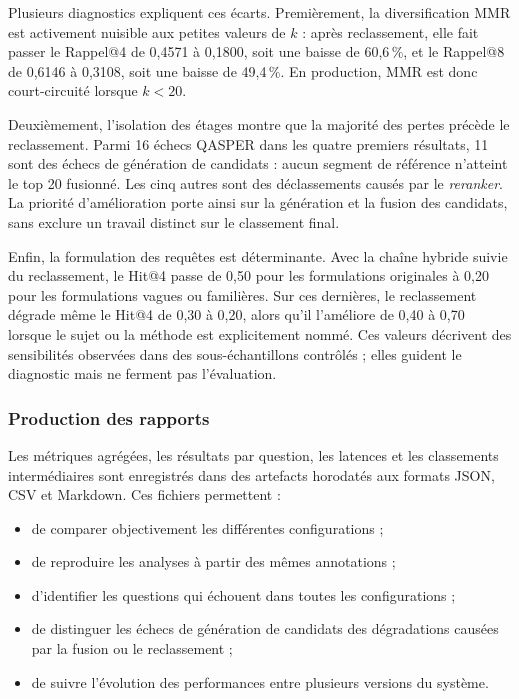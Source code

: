Plusieurs diagnostics expliquent ces écarts. Premièrement, la diversification MMR
est activement nuisible aux petites valeurs de \(k\) : après reclassement, elle fait
passer le Rappel@4 de 0,4571 à 0,1800, soit une baisse de 60,6\,\%, et le Rappel@8
de 0,6146 à 0,3108, soit une baisse de 49,4\,\%. En production, MMR est donc
court-circuité lorsque \(k<20\).

Deuxièmement, l'isolation des étages montre que la majorité des pertes précède le
reclassement. Parmi 16 échecs QASPER dans les quatre premiers résultats, 11 sont
des échecs de génération de candidats : aucun segment de référence n'atteint le
top 20 fusionné. Les cinq autres sont des déclassements causés par le
\emph{reranker}. La priorité d'amélioration porte ainsi sur la génération et la
fusion des candidats, sans exclure un travail distinct sur le classement final.

Enfin, la formulation des requêtes est déterminante. Avec la chaîne hybride suivie
du reclassement, le Hit@4 passe de 0,50 pour les formulations originales à 0,20
pour les formulations vagues ou familières. Sur ces dernières, le reclassement
dégrade même le Hit@4 de 0,30 à 0,20, alors qu'il l'améliore de 0,40 à 0,70
lorsque le sujet ou la méthode est explicitement nommé. Ces valeurs décrivent des
sensibilités observées dans des sous-échantillons contrôlés ; elles guident le
diagnostic mais ne ferment pas l'évaluation.

\subsubsection{Production des rapports}

Les métriques agrégées, les résultats par question, les latences et les classements
intermédiaires sont enregistrés dans des artefacts horodatés aux formats JSON, CSV et
Markdown. Ces fichiers permettent :

\begin{itemize}
  \item de comparer objectivement les différentes configurations ;
  \item de reproduire les analyses à partir des mêmes annotations ;
  \item d'identifier les questions qui échouent dans toutes les configurations ;
  \item de distinguer les échecs de génération de candidats des dégradations causées
        par la fusion ou le reclassement ;
  \item de suivre l'évolution des performances entre plusieurs versions du système.
\end{itemize}

